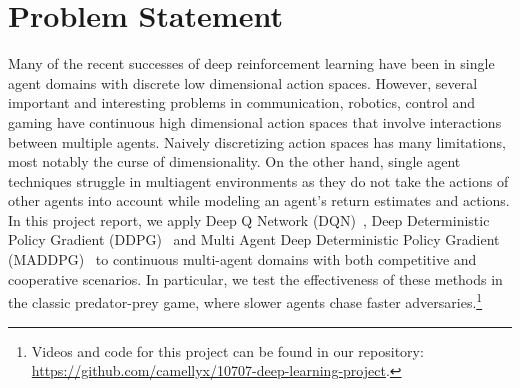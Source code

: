 
\section{Problem Statement}
\label{sec:problem}

Many of the recent successes of deep reinforcement learning have been in
single agent domains with discrete low dimensional action spaces. However, 
several important and interesting problems in communication, robotics, control
and gaming have continuous high dimensional action spaces that involve interactions
between multiple agents. Naively discretizing action spaces has many limitations,
most notably the curse of dimensionality. On the other hand, single agent techniques
struggle in multiagent environments as they do not take the actions of other agents
into account while modeling an agent's return estimates and actions. In this project
report, we apply Deep Q Network (DQN)~\cite{mnih2016dqn}, Deep Deterministic Policy Gradient (DDPG)~\cite{lillicrap2016continuous} and Multi Agent Deep Deterministic Policy Gradient (MADDPG)~\cite{lowe2017multi} to continuous multi-agent
domains with both competitive and cooperative scenarios. In particular, we test the 
effectiveness of these methods in the classic predator-prey game, where slower agents 
chase faster adversaries.\footnote{Videos and code for this project can be found
in our repository: \url{https://github.com/camellyx/10707-deep-learning-project}.}
 

